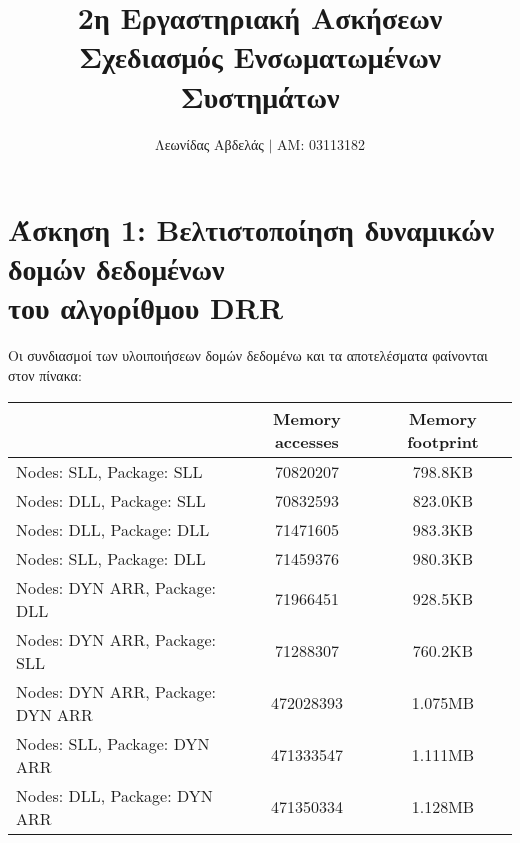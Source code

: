 \documentclass{article}
\title{2η Εργαστηριακή Ασκήσεων \\
        Σχεδιασμός Ενσωματωμένων Συστημάτων}
\newcommand{\english}[1]{\foreignlanguage{english}{{#1}}}
\begin{document}
\date{}
\author{Λεωνίδας Αβδελάς $|$ ΑΜ: 03113182}

\maketitle
\newpage

\section*{Άσκηση 1: Βελτιστοποίηση δυναμικών δομών δεδομένων \\ του αλγορίθμου \english{DRR}}

Οι συνδιασμοί των υλοιποιήσεων δομών δεδομένω και τα αποτελέσματα φαίνονται στον πίνακα:

\begin{otherlanguage}{english}
    \begin{center}
        \begin{tabular}{|p{100pt}|c|c|}\hline
            & Memory accesses & Memory footprint \\ \hline
            Nodes: SLL, \newline  Package: SLL & 70820207 & 798.8KB \\ \hline
            Nodes: DLL, \newline Package: SLL & 70832593 & 823.0KB \\ \hline
            Nodes: DLL, \newline Package: DLL & 71471605 & 983.3KB \\ \hline
            Nodes: SLL, \newline Package: DLL & 71459376 & 980.3KB \\ \hline
            Nodes: DYN ARR, \newline Package: DLL & 71966451 & 928.5KB \\ \hline
            Nodes: DYN ARR, \newline Package: SLL & 71288307 & 760.2KB \\ \hline
            Nodes: DYN ARR, \newline Package: DYN ARR & 472028393 & 1.075MB \\ \hline
            Nodes: SLL, \newline Package: DYN ARR & 471333547 & 1.111MB \\ \hline
            Nodes: DLL, \newline Package: DYN ARR & 471350334 & 1.128MB \\ \hline
       \end{tabular}
    \end{center}
\end{otherlanguage}
\end{document}
